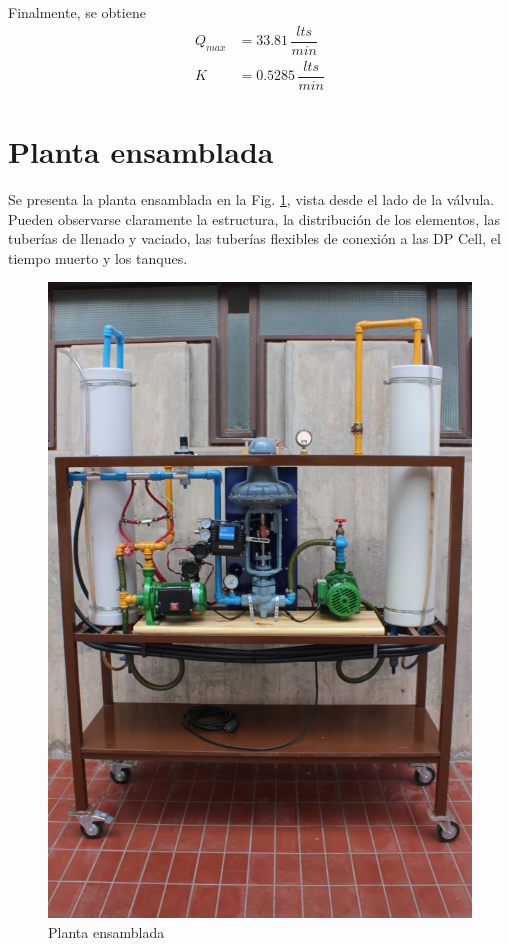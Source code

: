 Finalmente, se obtiene
\begin{align}
 Q_{max} &= 33.81\,\dfrac{lts}{min}
 \\
 K  &= 0.5285\,\dfrac{lts}{min}
\end{align}

\section{Planta ensamblada}
Se presenta la planta ensamblada en la Fig. \ref{fig:PlantaEnsamblada}, vista
desde el lado de la válvula.
Pueden observarse claramente la estructura, la distribución de los elementos,
las tuberías de llenado y vaciado, las tuberías flexibles de conexión a las DP
Cell, el tiempo muerto y los tanques.

\begin{figure}[ht]
	\centering
\includegraphics[width=.94\textwidth]{Cap2-DisenoEnsamblado/images/IMG_5123.JPG}
	\caption{Planta ensamblada}
	\label{fig:PlantaEnsamblada}
\end{figure}

